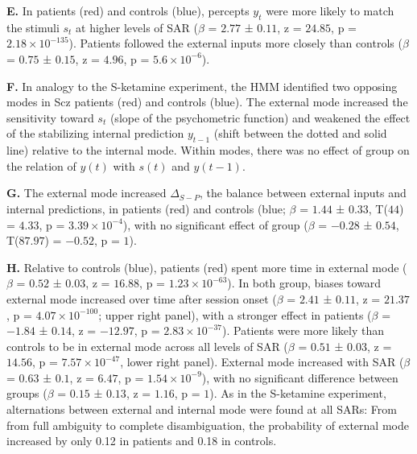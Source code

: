 \documentclass[
]{article}
\begin{document}
\textbf{E.} In patients (red) and controls (blue), percepts \(y_t\) were
more likely to match the stimuli \(s_t\) at higher levels of SAR
(\(\beta\) = \(2.77\) ± \(0.11\), z = \(24.85\), p =
\(\ensuremath{2.18\times 10^{-135}}\)). Patients followed the external
inputs more closely than controls (\(\beta\) = \(0.75\) ± \(0.15\), z =
\(4.96\), p = \(\ensuremath{5.6\times 10^{-6}}\)).

\textbf{F.} In analogy to the S-ketamine experiment, the HMM identified
two opposing modes in Scz patients (red) and controls (blue). The
external mode increased the sensitivity toward \(s_t\) (slope of the
psychometric function) and weakened the effect of the stabilizing
internal prediction \(y_{t-1}\) (shift between the dotted and solid
line) relative to the internal mode. Within modes, there was no effect
of group on the relation of \(y(t)\) with \(s(t)\) and \(y(t-1)\).

\textbf{G.} The external mode increased \(\Delta_{S-P}\), the balance
between external inputs and internal predictions, in patients (red) and
controls (blue; \(\beta\) = \(1.44\) ± \(0.33\), T(\(44\)) = \(4.33\), p
= \(\ensuremath{3.39\times 10^{-4}}\)), with no significant effect of
group (\(\beta\) = \(-0.28\) ± \(0.54\), T(\(87.97\)) = \(-0.52\), p =
\(1\)).

\textbf{H.} Relative to controls (blue), patients (red) spent more time
in external mode (\(\beta\) = \(0.52\) ± \(0.03\), z = \(16.88\), p =
\(\ensuremath{1.23\times 10^{-63}}\)). In both group, biases toward
external mode increased over time after session onset (\(\beta\) =
\(2.41\) ± \(0.11\), z = \(21.37\), p =
\(\ensuremath{4.07\times 10^{-100}}\); upper right panel), with a
stronger effect in patients (\(\beta\) = \(-1.84\) ± \(0.14\), z =
\(-12.97\), p = \(\ensuremath{2.83\times 10^{-37}}\)). Patients were
more likely than controls to be in external mode across all levels of
SAR (\(\beta\) = \(0.51\) ± \(0.03\), z = \(14.56\), p =
\(\ensuremath{7.57\times 10^{-47}}\), lower right panel). External mode
increased with SAR (\(\beta\) = \(0.63\) ± \(0.1\), z = \(6.47\), p =
\(\ensuremath{1.54\times 10^{-9}}\)), with no significant difference
between groups (\(\beta\) = \(0.15\) ± \(0.13\), z = \(1.16\), p =
\(1\)). As in the S-ketamine experiment, alternations between external
and internal mode were found at all SARs: From from full ambiguity to
complete disambiguation, the probability of external mode increased by
only 0.12 in patients and 0.18 in controls.

\newpage
\end{document}
